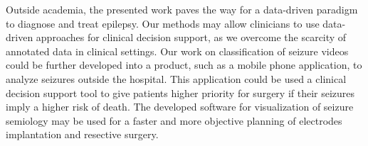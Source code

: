 Outside academia, the presented work paves the way for a data-driven paradigm to diagnose and treat epilepsy.
Our methods may allow clinicians to use data-driven approaches for clinical decision support, as we overcome the scarcity of annotated data in clinical settings.
Our work on classification of seizure videos could be further developed into a product, such as a mobile phone application, to analyze seizures outside the hospital.
This application could be used a clinical decision support tool to give patients higher priority for surgery if their seizures imply a higher risk of death.
The developed software for visualization of seizure semiology may be used for a faster and more objective planning of electrodes implantation and resective surgery.









